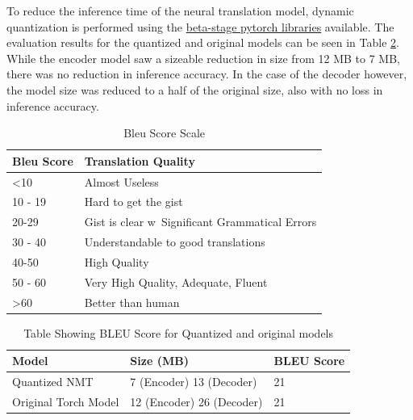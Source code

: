 \documentclass{sigchi}
\begin{document}
\par To reduce the inference time of the neural translation model, dynamic quantization is performed using the \href{https://pytorch.org/docs/stable/quantization.html}{beta-stage pytorch libraries} available. The evaluation results for the quantized and original models can be seen in Table \ref{tab:resultstable}. While the encoder model saw a sizeable reduction in size from 12 MB to 7 MB, there was no reduction in inference accuracy. In the case of the decoder however, the model size was reduced to a half of the original size, also with no loss in inference accuracy.

\begin{table}[t]
\centering
    \begin{tabular}{ |p{2cm}|p{2cm}|}
     \hline
      Bleu Score & Translation Quality\\
     \hline
     <10 & Almost Useless\\
     \hline
     10 - 19 & Hard to get the gist\\
     \hline
     20-29 & Gist is clear w\ Significant Grammatical Errors\\
     \hline
     30 - 40 & Understandable to good translations\\
     \hline
     40-50 & High Quality \\
     \hline
     50 - 60 & Very High Quality, Adequate, Fluent\\
     \hline
     >60 & Better than human \\
     \hline
    \end{tabular}
\caption{Bleu Score Scale}
\label{tab:bleu_score}

\end{table}


\begin{table}[t]

\centering
    \begin{tabular}{ |p{2cm}||p{2cm}|| p{2cm}| }
     \hline
     Model& Size (MB) & BLEU Score\\
     \hline
     Quantized NMT & 7 (Encoder) 13 (Decoder) & 21\\
     \hline
     Original Torch Model & 12 (Encoder) 26 (Decoder) & 21\\
     \hline
    \end{tabular}
\caption{Table Showing BLEU Score for Quantized and original models}
\label{tab:resultstable}

\end{table}
\end{document}
